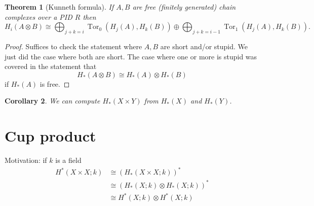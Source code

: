 \documentclass[10pt,]{book}
\theoremstyle{plain}
\newtheorem{theorem}{Theorem}[section]
\newtheorem{corollary}[theorem]{Corollary}
\theoremstyle{definition}
\numberwithin{equation}{section}
\DeclareMathOperator{\Tor}{Tor}
\begin{document}
\begin{theorem}[Kunneth formula]\label{theorem-4}
If \(A,B\) are free (finitely generated) chain complexes over a PID \(R\) then
            \[H_i(A\otimes B) \cong \bigoplus_{j + k = i} \Tor_0(H_j(A), H_k(B)) \oplus\bigoplus_{j+k = i-1} \Tor_1(H_j(A), H_k(B)).\]\end{theorem}
\begin{proof}
Suffices to check the statement where \(A,B\) are short and/or stupid.
            We just did the case where both are short.
            The case where one or more is stupid was covered in the statement that
            \[H_*(A\otimes B) \cong H_*(A) \otimes H_*(B)\]
            if \(H_*(A)\) is free.
          \end{proof}
\begin{corollary}\label{corollary-10}
We can compute \(H_*(X\times Y)\) from \(H_*(X)\) and \(H_*(Y)\).\end{corollary}
\typeout{************************************************}
\typeout{************************************************}
\section[Cup product]{Cup product}\label{section-11}
Motivation: if \(k\) is a field
          \begin{align*}
H^*(X\times X; k) &\cong (H_*(X\times X; k))^*\\
 &\cong (H_*(X; k)\otimes H_*(X; k))^*\\
 &\cong H^*(X; k)\otimes H^*(X; k)
\end{align*}
          
\end{document}
